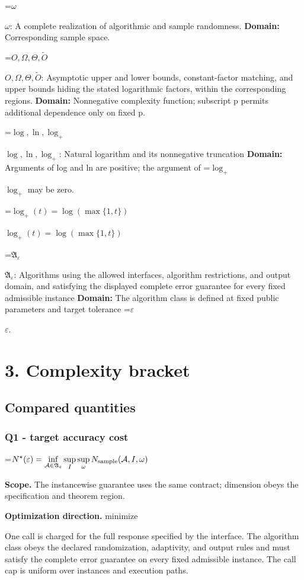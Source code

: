 \documentclass[10pt,a4paper]{article}
\newcommand{\AtlasMath}[1]{\par\begingroup\centering\setbox0=\hbox{$\displaystyle #1$}\ifdim\wd0>1.4\linewidth\typeout{ATLAS WIDE FORMULA: \the\wd0}\fi\ifdim\wd0>\linewidth\resizebox{\linewidth}{!}{\box0}\else\box0\fi\par\endgroup}
\newcommand{\AtlasInlineMath}[1]{\begingroup\setbox0=\hbox{$#1$}\ifdim\wd0>.4\linewidth\endgroup\AtlasMath{#1}\else\endgroup$#1$\fi}
\begin{document}
\AtlasInlineMath{\omega}: A complete realization of algorithmic and sample randomness. \textbf{Domain:} Corresponding sample space.

\AtlasInlineMath{O,\Omega,\Theta,\widetilde O}: Asymptotic upper and lower bounds, constant-factor matching, and upper bounds hiding the stated logarithmic factors, within the corresponding regions. \textbf{Domain:} Nonnegative complexity function; subscript p permits additional dependence only on fixed p.

\AtlasInlineMath{\log,\ln,\log_+}: Natural logarithm and its nonnegative truncation \textbf{Domain:} Arguments of log and ln are positive; the argument of \AtlasInlineMath{\log_+} may be zero.

\AtlasInlineMath{\log_+(t)=\log(\max\{1,t\})}

\AtlasInlineMath{\mathfrak A_\varepsilon}: Algorithms using the allowed interfaces, algorithm restrictions, and output domain, and satisfying the displayed complete error guarantee for every fixed admissible instance \textbf{Domain:} The algorithm class is defined at fixed public parameters and target tolerance \AtlasInlineMath{\varepsilon}.

\section{3. Complexity bracket}
\subsection{Compared quantities}
\subsubsection{Q1 - target accuracy cost}
\AtlasMath{N^\star(\varepsilon)=\inf_{\mathcal A\in\mathfrak A_\varepsilon}\sup_I \sup_\omega N_{\rm sample}(\mathcal A,I,\omega)}
\textbf{Scope.} The instancewise guarantee uses the same contract; dimension obeys the specification and theorem region.

\textbf{Optimization direction.} minimize

One call is charged for the full response specified by the interface. The algorithm class obeys the declared randomization, adaptivity, and output rules and must satisfy the complete error guarantee on every fixed admissible instance. The call cap is uniform over instances and execution paths.
\end{document}
